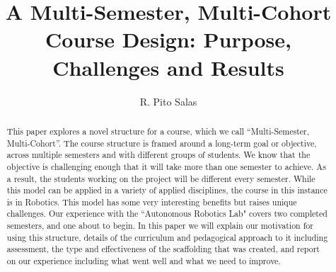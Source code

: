 \documentclass[sigconf, authordraft]{acmart}
\begin{document}
\title{A Multi-Semester, Multi-Cohort Course Design: Purpose, Challenges and Results}

\author{R. Pito Salas}

\begin{abstract}
This paper explores a novel structure for a course, which we call ``Multi-Semester, Multi-Cohort”. The course structure is framed around a long-term goal or objective, across multiple semesters and with different groups of students. We know that the objective is challenging enough that it will take more than one semester to achieve. As a result, the students working on the project will be different every semester. While this model can be applied in a variety of applied disciplines, the course in this instance is in Robotics. This model has some very interesting benefits but raises unique challenges. Our experience with the ``Autonomous Robotics Lab" covers two completed semesters, and one about to begin. In this paper we will explain our motivation for using this structure, details of the curriculum and pedagogical approach to it including assessment, the type and effectiveness of the scaffolding that was created, and report on our experience including what went well and what we need to improve.
\end{abstract}




\end{document}
